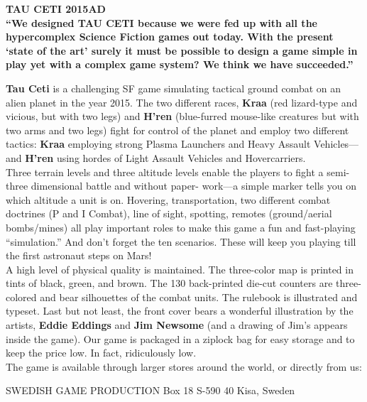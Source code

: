 \noindent
\begin{adjustwidth}{-0.2cm}{}
\begin{tcolorbox}[colframe=black, colback=white, sharp corners, boxrule=1.5pt,%
   width=1.1\linewidth,%
   left=1pt,
   right=1pt]
\fontsize{6pt}{7.5pt}\rmfamily %

\textbf{TAU CETI 2015AD} \\[6pt]
\textbf{“We designed TAU CETI because we were fed up
with all the hypercomplex Science Fiction games
out today. With the present ‘state of the art’
surely it must be possible to design a game
simple in play yet with a complex game system?
We think we have succeeded.”}

\textbf{Tau Ceti} is a challenging SF game simulating tactical ground
combat on an alien planet in the year 2015. The two different
races, \textbf{Kraa} (red lizard-type and vicious, but with two legs) and
\textbf{H’ren} (blue-furred mouse-like creatures but with two arms
and two legs) fight for control of the planet and employ two
different tactics: \textbf{Kraa} employing strong Plasma Launchers
and Heavy Assault Vehicles—and \textbf{H’ren} using hordes of Light
Assault Vehicles and Hovercarriers. \\[1pt]

Three terrain levels and three altitude levels enable the players
to fight a semi-three dimensional battle and without paper-
work—a simple marker tells you on which altitude a unit is on.
Hovering, transportation, two different combat doctrines (P
and I Combat), line of sight, spotting, remotes (ground/aerial
bombs/mines) all play important roles to make this game a fun
and fast-playing “simulation.” And don’t forget the ten
scenarios. These will keep you playing till the first astronaut
steps on Mars! \\[6pt]

A high level of physical quality is maintained. The three-color
map is printed in tints of black, green, and brown. The 130
back-printed die-cut counters are three-colored and bear
silhouettes of the combat units. The rulebook is illustrated and
typeset. Last but not least, the front cover bears a wonderful
illustration by the artists, \textbf{Eddie Eddings} and \textbf{Jim Newsome}
(and a drawing of Jim’s appears inside the game). Our game
is packaged in a ziplock bag for easy storage and to keep the
price low. In fact, ridiculously low. \\[6pt]

The game is available through larger stores around the world,
or directly from us:

\end{tcolorbox}
\end{adjustwidth}
SWEDISH GAME PRODUCTION
Box 18
S-590 40 Kisa, Sweden

